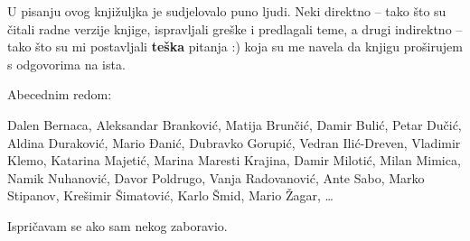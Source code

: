 
U pisanju ovog knjižuljka je sudjelovalo puno ljudi.
Neki direktno -- tako što su čitali radne verzije knjige, ispravljali greške i predlagali teme, a drugi indirektno -- tako što su mi postavljali \textbf{teška} pitanja :) koja su me navela da knjigu proširujem s odgovorima na ista.

Abecednim redom:

Dalen Bernaca,
Aleksandar Branković,
Matija Brunčić,
Damir Bulić,
Petar Dučić,
Aldina Duraković,
Mario Đanić,
Dubravko Gorupić,
Vedran Ilić-Dreven,
Vladimir Klemo,
Katarina Majetić,
Marina Maresti Krajina,
Damir Milotić, 
Milan Mimica,
Namik Nuhanović,
Davor Poldrugo,
Vanja Radovanović,
Ante Sabo,
Marko Stipanov,
Krešimir Šimatović,
Karlo Šmid,
Mario Žagar,
\dots

Ispričavam se ako sam nekog zaboravio.
